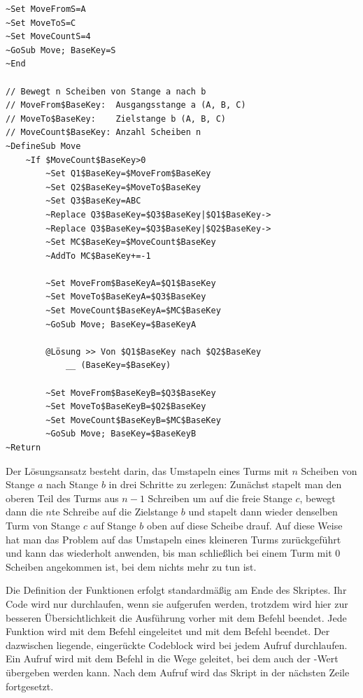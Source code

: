 \label{BspTuermeVonHanoi}
\begin{verbatim}
~Set MoveFromS=A
~Set MoveToS=C
~Set MoveCountS=4
~GoSub Move; BaseKey=S
~End

// Bewegt n Scheiben von Stange a nach b
// MoveFrom$BaseKey:  Ausgangsstange a (A, B, C)
// MoveTo$BaseKey:    Zielstange b (A, B, C)
// MoveCount$BaseKey: Anzahl Scheiben n
~DefineSub Move
    ~If $MoveCount$BaseKey>0
        ~Set Q1$BaseKey=$MoveFrom$BaseKey
        ~Set Q2$BaseKey=$MoveTo$BaseKey
        ~Set Q3$BaseKey=ABC
        ~Replace Q3$BaseKey=$Q3$BaseKey|$Q1$BaseKey->
        ~Replace Q3$BaseKey=$Q3$BaseKey|$Q2$BaseKey->
        ~Set MC$BaseKey=$MoveCount$BaseKey
        ~AddTo MC$BaseKey+=-1

        ~Set MoveFrom$BaseKeyA=$Q1$BaseKey
        ~Set MoveTo$BaseKeyA=$Q3$BaseKey
        ~Set MoveCount$BaseKeyA=$MC$BaseKey
        ~GoSub Move; BaseKey=$BaseKeyA
        
        @Lösung >> Von $Q1$BaseKey nach $Q2$BaseKey
            __ (BaseKey=$BaseKey)
        
        ~Set MoveFrom$BaseKeyB=$Q3$BaseKey
        ~Set MoveTo$BaseKeyB=$Q2$BaseKey
        ~Set MoveCount$BaseKeyB=$MC$BaseKey
        ~GoSub Move; BaseKey=$BaseKeyB
~Return
\end{verbatim}

Der Lösungsansatz besteht darin, das Umstapeln eines Turms mit $n$ Scheiben von Stange $a$ nach Stange $b$ in drei Schritte zu zerlegen: Zunächst stapelt man den oberen Teil des Turms aus $n-1$ Schreiben um auf die freie Stange $c$, bewegt dann die $n$te Schreibe auf die Zielstange $b$ und stapelt dann wieder denselben Turm von Stange $c$ auf Stange $b$ oben auf diese Scheibe drauf. Auf diese Weise hat man das Problem auf das Umstapeln eines kleineren Turms zurückgeführt und kann das wiederholt anwenden, bis man schließlich bei einem Turm mit $0$ Scheiben angekommen ist, bei dem nichts mehr zu tun ist.

Die Definition der Funktionen erfolgt standardmäßig am Ende des Skriptes. Ihr Code wird nur durchlaufen, wenn sie aufgerufen werden, trotzdem wird hier zur besseren Übersichtlichkeit die Ausführung vorher mit dem Befehl  beendet. Jede Funktion wird mit dem Befehl  eingeleitet und mit dem Befehl  beendet. Der dazwischen liegende, eingerückte Codeblock wird bei jedem Aufruf durchlaufen. Ein Aufruf wird mit dem Befehl  in die Wege geleitet, bei dem auch der -Wert übergeben werden kann. Nach dem Aufruf wird das Skript in der nächsten Zeile fortgesetzt.


